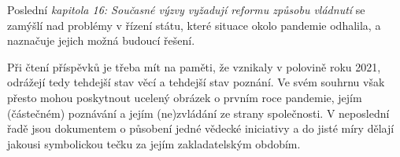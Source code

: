 Poslední {\em kapitola 16: Současné výzvy vyžadují reformu způsobu vládnutí} se zamýšlí nad problémy v řízení státu, které situace okolo pandemie odhalila, a naznačuje jejich možná budoucí řešení.





Při čtení příspěvků je třeba mít na paměti, že vznikaly v polovině roku 2021, odrážejí tedy tehdejší stav věcí a tehdejší stav poznání. Ve svém souhrnu však přesto mohou poskytnout ucelený obrázek o prvním roce pandemie, jejím (částečném) poznávání a jejím (ne)zvládání ze strany společnosti. V neposlední řadě jsou dokumentem o působení jedné vědecké iniciativy a do jisté míry dělají jakousi symbolickou tečku za jejím zakladatelským obdobím.


